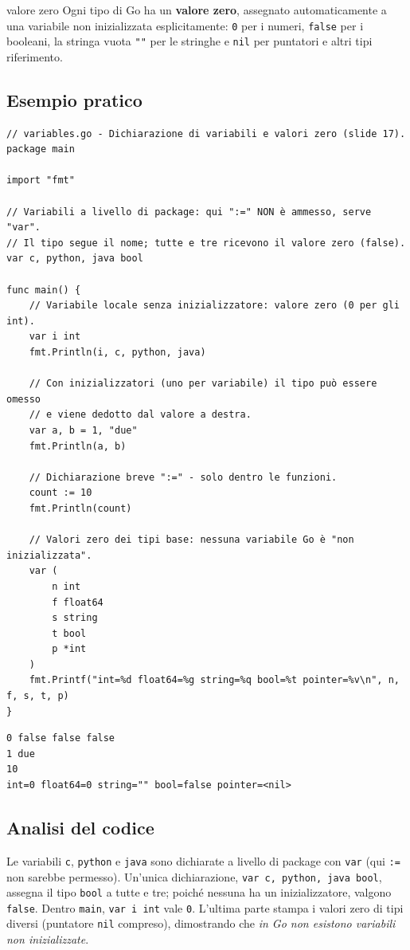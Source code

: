 \documentclass[11pt,a4paper]{report}
\newcommand{\cod}[1]{\texttt{#1}}
\begin{document}
\begin{definizione}{valore zero}
Ogni tipo di Go ha un \textbf{valore zero}, assegnato automaticamente a una
variabile non inizializzata esplicitamente: \cod{0} per i numeri, \cod{false}
per i booleani, la stringa vuota \cod{""} per le stringhe e \cod{nil} per
puntatori e altri tipi riferimento.
\end{definizione}

\subsection{Esempio pratico}

\begin{lstlisting}[style=gocode,caption={\texttt{01\_basics/variables.go}}]
// variables.go - Dichiarazione di variabili e valori zero (slide 17).
package main

import "fmt"

// Variabili a livello di package: qui ":=" NON è ammesso, serve "var".
// Il tipo segue il nome; tutte e tre ricevono il valore zero (false).
var c, python, java bool

func main() {
	// Variabile locale senza inizializzatore: valore zero (0 per gli int).
	var i int
	fmt.Println(i, c, python, java)

	// Con inizializzatori (uno per variabile) il tipo può essere omesso
	// e viene dedotto dal valore a destra.
	var a, b = 1, "due"
	fmt.Println(a, b)

	// Dichiarazione breve ":=" - solo dentro le funzioni.
	count := 10
	fmt.Println(count)

	// Valori zero dei tipi base: nessuna variabile Go è "non inizializzata".
	var (
		n int
		f float64
		s string
		t bool
		p *int
	)
	fmt.Printf("int=%d float64=%g string=%q bool=%t pointer=%v\n", n, f, s, t, p)
}
\end{lstlisting}
\begin{lstlisting}[style=output]
0 false false false
1 due
10
int=0 float64=0 string="" bool=false pointer=<nil>
\end{lstlisting}

\subsection{Analisi del codice}

Le variabili \cod{c}, \cod{python} e \cod{java} sono dichiarate a livello di
package con \cod{var} (qui \cod{:=} non sarebbe permesso). Un'unica
dichiarazione, \cod{var c, python, java bool}, assegna il tipo \cod{bool} a tutte
e tre; poiché nessuna ha un inizializzatore, valgono \cod{false}. Dentro
\cod{main}, \cod{var i int} vale \cod{0}. L'ultima parte stampa i valori zero di
tipi diversi (puntatore \cod{nil} compreso), dimostrando che \emph{in Go non
esistono variabili non inizializzate}.
\end{document}
